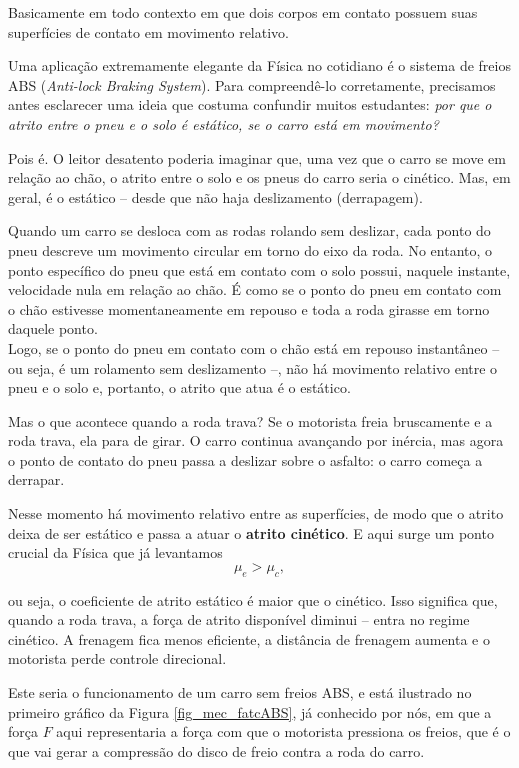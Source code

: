 
Basicamente em todo contexto em que dois corpos em contato possuem suas superfícies de contato em movimento relativo. 

Uma aplicação extremamente elegante da Física no cotidiano é o sistema de freios ABS (\textit{Anti-lock Braking System}). Para compreendê-lo corretamente, precisamos antes esclarecer uma ideia que costuma confundir muitos estudantes: \textit{por que o atrito entre o pneu e o solo é estático, se o carro está em movimento?}

Pois é. O leitor desatento poderia imaginar que, uma vez que o carro se move em relação ao chão, o atrito entre o solo e os pneus do carro seria o cinético. Mas, em geral, é o estático -- desde que não haja deslizamento (derrapagem).


Quando um carro se desloca com as rodas rolando sem deslizar, cada ponto do pneu descreve um movimento circular em torno do eixo da roda. No entanto, o ponto específico do pneu que está em contato com o solo possui, naquele instante, velocidade nula em relação ao chão. É como se o ponto do pneu em contato com o chão estivesse momentaneamente em repouso e toda a roda girasse em torno daquele ponto. \\



Logo, se o ponto do pneu em contato com o chão está em repouso instantâneo -- ou seja, é um rolamento sem deslizamento --, não há movimento relativo entre o pneu e o solo e, portanto, o atrito que atua é o estático.

Mas o que acontece quando a roda trava? Se o motorista freia bruscamente e a roda trava, ela para de girar. O carro continua avançando por inércia, mas agora o ponto de contato do pneu passa a deslizar sobre o asfalto: o carro começa a derrapar.

Nesse momento há movimento relativo entre as superfícies, de modo que o atrito deixa de ser estático e passa a atuar o \textbf{atrito cinético}. E aqui surge um ponto crucial da Física que já levantamos
\[
\mu_e > \mu_c,
\]

\noindent ou seja, o coeficiente de atrito estático é maior que o cinético. Isso significa que, quando a roda trava, a força de atrito disponível diminui -- entra no regime cinético. A frenagem fica menos eficiente, a distância de frenagem aumenta e o motorista perde controle direcional. 

Este seria o funcionamento de um carro sem freios ABS, e está ilustrado no primeiro gráfico da Figura \ref{fig_mec_fatcABS}, já conhecido por nós, em que a força $F$ aqui representaria a força com que o motorista pressiona os freios, que é o que vai gerar a compressão do disco de freio contra a roda do carro.

